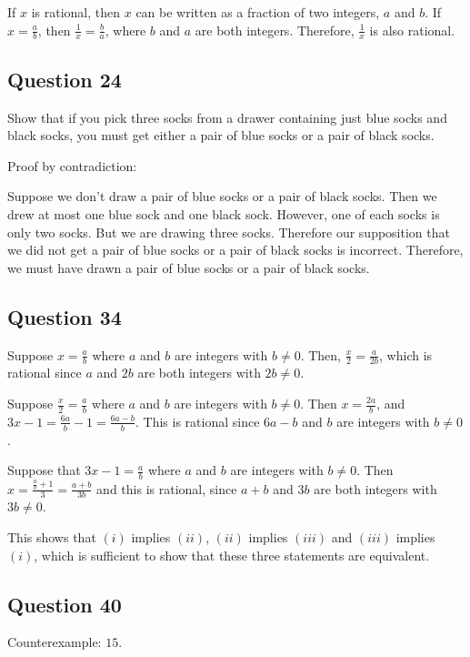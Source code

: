 \documentclass[12pt]{article}
\begin{document}
If $x$ is rational, then $x$ can be written as a fraction of two integers, $a$
and $b$. If $x = \frac{a}{b}$, then $\frac{1}{x} = \frac{b}{a}$, where $b$ and
$a$ are both integers. Therefore, $\frac{1}{x}$ is also rational.

\subsection*{Question 24}

Show that if you pick three socks from a drawer containing just blue socks and
black socks, you must get either a pair of blue socks or a pair of black socks.

Proof by contradiction:

Suppose we don't draw a pair of blue socks or a pair of black socks. Then we
drew at most one blue sock and one black sock. However, one of each socks is
only two socks. But we are drawing three socks. Therefore our supposition that
we did not get a pair of blue socks or a pair of black socks is incorrect.
Therefore, we must have drawn a pair of blue socks or a pair of black socks.

\subsection*{Question 34}

Suppose $x = \frac{a}{b}$ where $a$ and $b$ are integers with $b \ne 0$.
Then, $\frac{x}{2} = \frac{a}{2b}$, which is rational since $a$ and $2b$ are
both integers with $2b \ne 0$.

Suppose $\frac{x}{2} = \frac{a}{b}$ where $a$ and $b$ are integers with $b \ne 0$.
Then $x = \frac{2a}{b}$, and $3x-1 = \frac{6a}{b}-1 = \frac{6a-b}{b}$. This is
rational since $6a-b$ and $b$ are integers with $b \ne 0$.

Suppose that $3x-1 = \frac{a}{b}$ where $a$ and $b$ are integers with $b \ne 0$.
Then $x = \frac{\frac{a}{b}+1}{3} = \frac{a+b}{3b}$ and this is rational, since
$a+b$ and $3b$ are both integers with $3b \ne 0$.

This shows that $(i)$ implies $(ii)$, $(ii)$ implies $(iii)$ and $(iii)$
implies $(i)$, which is sufficient to show that these three statements are
equivalent.

\subsection*{Question 40}

Counterexample: $15$.
\end{document}
